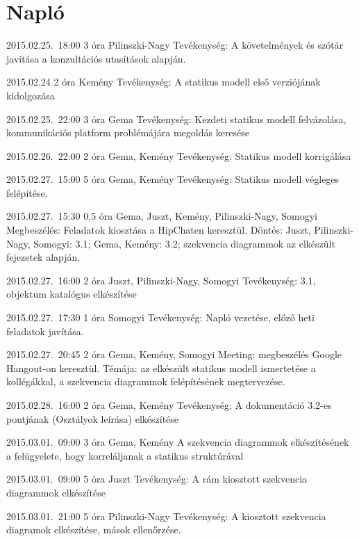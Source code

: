 %
\section{Napló}

\begin{naplo}

\bejegyzes
{2015.02.25.~18:00} %
{3 óra} %
{Pilinszki-Nagy} %
{Tevékenység: A követelmények és szótár javítása a konzultációs utasítások alapján.} %

\bejegyzes
{2015.02.24}
{2 óra}
{Kemény}
{Tevékenység: A statikus modell első verziójának kidolgozása}

\bejegyzes
{2015.02.25.~22:00}
{3 óra}
{Gema}
{Tevékenység: Kezdeti statikus modell felvázolása, kommunikációs platform problémájára megoldás keresése}

\bejegyzes
{2015.02.26.~22:00}
{2 óra}
{Gema, Kemény}
{Tevékenység: Statikus modell korrigálása}

\bejegyzes
{2015.02.27.~15:00} %
{5 óra} %
{Gema, Kemény} %
{Tevékenység: Statikus modell végleges felépítése.} %

\bejegyzes
{2015.02.27.~15:30} %
{0,5 óra} %
{Gema, Juszt, Kemény, Pilinszki-Nagy, Somogyi} %
{Megbeszélés: Feladatok kiosztása a HipChaten keresztül. Döntés: Juszt, Pilinszki-Nagy, Somogyi: 3.1; Gema, Kemény: 3.2; szekvencia diagrammok az elkészült fejezetek alapján.} %

\bejegyzes
{2015.02.27.~16:00} %
{2 óra} %
{Juszt, Pilinszki-Nagy, Somogyi} %
{Tevékenység: 3.1, objektum katalógus elkészítése} %

\bejegyzes
{2015.02.27.~17:30} %
{1 óra} %
{Somogyi} %
{Tevékenység: Napló vezetése, előző heti feladatok javítása.} %

\bejegyzes
{2015.02.27.~20:45} %
{2 óra} %
{Gema, Kemény, Somogyi} %
{Meeting: megbeszélés Google Hangout-on keresztül. Témája: az elkészült statikus modell ismertetése a kollégákkal, a szekvencia diagrammok felépítésének megtervezése.} %

\bejegyzes
{2015.02.28.~16:00}
{2 óra}
{Gema, Kemény}
{Tevékenység: A dokumentáció 3.2-es pontjának (Osztályok leírása) elkészítése}

\bejegyzes
{2015.03.01.~09:00}
{3 óra}
{Gema, Kemény}
{A szekvencia diagrammok elkészítésének a felügyelete, hogy korreláljanak a statikus struktúrával }

\bejegyzes
{2015.03.01.~09:00}
{5 óra}
{Juszt}
{Tevékenység: A rám kiosztott szekvencia diagrammok elkészítése}

\bejegyzes
{2015.03.01.~21:00}
{5 óra}
{Pilinszki-Nagy}
{Tevékenység: A kiosztott szekvencia diagramok elkészítése, mások ellenőrzése.}

\end{naplo}

